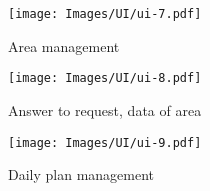 
\begin{figure}[H]
	\centering
    \texttt{[image: Images/UI/ui-7.pdf]}
	\caption{\label{fig:ui_area}Area management}
\end{figure}
\newpage
\begin{figure}[H]
	\centering
    \texttt{[image: Images/UI/ui-8.pdf]}
	\caption{\label{fig:ui_ans_request}Answer to request, data of area}
\end{figure}

\begin{figure}[H]
	\centering
    \texttt{[image: Images/UI/ui-9.pdf]}
	\caption{\label{fig:ui_daily}Daily plan management}
\end{figure}